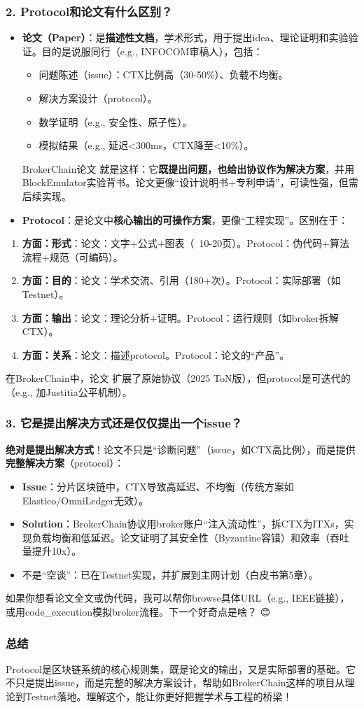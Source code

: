 \documentclass[a4paper,12pt]{ctexart}
\begin{document}
\subsubsection*{2. Protocol和论文有什么区别？}
\begin{itemize}
  \item \textbf{论文（Paper）}：是\textbf{描述性文档}，学术形式，用于提出idea、理论证明和实验验证。目的是说服同行（e.g., INFOCOM审稿人），包括：
    \begin{itemize}
      \item 问题陈述（issue）：CTX比例高（30-50\%）、负载不均衡。
      \item 解决方案设计（protocol）。
      \item 数学证明（e.g., 安全性、原子性）。
      \item 模拟结果（e.g., 延迟<300ms，CTX降至<10\%）。
    \end{itemize}
    BrokerChain论文 就是这样：它\textbf{既提出问题，也给出协议作为解决方案}，并用BlockEmulator实验背书。论文更像“设计说明书+专利申请”，可读性强，但需后续实现。
  \item \textbf{Protocol}：是论文中\textbf{核心输出的可操作方案}，更像“工程实现”。区别在于：
\end{itemize}
\begin{enumerate}
\item \textbf{方面：形式}：论文：文字+公式+图表（~10-20页）。Protocol：伪代码+算法流程+规范（可编码）。
\item \textbf{方面：目的}：论文：学术交流、引用（180+次）。Protocol：实际部署（如Testnet）。
\item \textbf{方面：输出}：论文：理论分析+证明。Protocol：运行规则（如broker拆解CTX）。
\item \textbf{方面：关系}：论文：描述protocol。Protocol：论文的“产品”。
\end{enumerate}
在BrokerChain中，论文 扩展了原始协议（2025 ToN版），但protocol是可迭代的（e.g., 加Justitia公平机制）。

\subsubsection*{3. 它是提出解决方式还是仅仅提出一个issue？}
\textbf{绝对是提出解决方式}！论文不只是“诊断问题”（issue，如CTX高比例），而是提供\textbf{完整解决方案}（protocol）：
\begin{itemize}
  \item \textbf{Issue}：分片区块链中，CTX导致高延迟、不均衡（传统方案如Elastico/OmniLedger无效）。
  \item \textbf{Solution}：BrokerChain协议用broker账户“注入流动性”，拆CTX为ITXs，实现负载均衡和低延迟。论文证明了其安全性（Byzantine容错）和效率（吞吐量提升10x）。
  \item 不是“空谈”：已在Testnet实现，并扩展到主网计划（白皮书第5章）。
\end{itemize}
如果你想看论文全文或伪代码，我可以帮你browse具体URL（e.g., IEEE链接），或用code\_execution模拟broker流程。下一个好奇点是啥？ 😊

\subsubsection*{总结}
Protocol是区块链系统的核心规则集，既是论文的输出，又是实际部署的基础。它不只是提出issue，而是完整的解决方案设计，帮助如BrokerChain这样的项目从理论到Testnet落地。理解这个，能让你更好把握学术与工程的桥梁！
\end{document}
